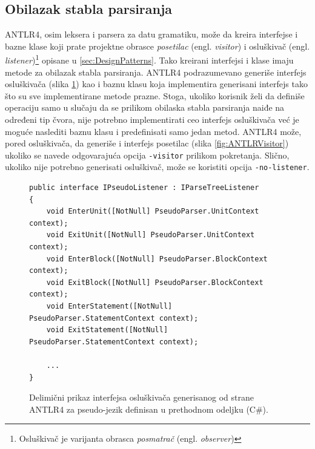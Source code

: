\subsection{Obilazak stabla parsiranja}
\label{subsec:ANTLRParserIntegration}

ANTLR4, osim leksera i parsera za datu gramatiku, može da kreira interfejse i bazne klase koji prate projektne obrasce \emph{posetilac} (engl. \emph{visitor}) i osluškivač (engl. \emph{listener})\footnote{Osluškivač je varijanta obrasca \emph{posmatrač} (engl. \emph{observer})} opisane u \ref{sec:DesignPatterns}. Tako kreirani interfejsi i klase imaju metode za obilazak stabla parsiranja. ANTLR4 podrazumevano generiše interfejs osluškivača (slika \ref{fig:ANTLRListener}) kao i baznu klasu koja implementira generisani interfejs tako što su sve implementirane metode prazne. Stoga, ukoliko korisnik želi da definiše operaciju samo u slučaju da se prilikom obilaska stabla parsiranja naiđe na određeni tip čvora, nije potrebno implementirati ceo interfejs osluškivača već je moguće naslediti baznu klasu i predefinisati samo jedan metod. ANTLR4 može, pored osluškivača, da generiše i interfejs posetilac (slika \ref{fig:ANTLRVisitor}) ukoliko se navede odgovarajuća opcija \texttt{-visitor} prilikom pokretanja. Slično, ukoliko nije potrebno generisati osluškivač, može se koristiti opcija \texttt{-no-listener}.

\begin{figure}[h!]
\begin{lstlisting}
public interface IPseudoListener : IParseTreeListener
{
    void EnterUnit([NotNull] PseudoParser.UnitContext context);
    void ExitUnit([NotNull] PseudoParser.UnitContext context);
    void EnterBlock([NotNull] PseudoParser.BlockContext context);
    void ExitBlock([NotNull] PseudoParser.BlockContext context);
    void EnterStatement([NotNull] PseudoParser.StatementContext context);
    void ExitStatement([NotNull] PseudoParser.StatementContext context);
    
    ...
}
\end{lstlisting}
\caption{Delimični prikaz interfejsa osluškivača generisanog od strane ANTLR4 za pseudo-jezik definisan u prethodnom odeljku (C\#).}
\label{fig:ANTLRListener}
\end{figure}

